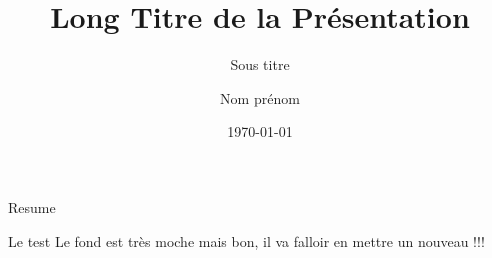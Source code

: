 \documentclass[aspectratio=169,xcolor=dvipsnames, t]{beamer}
\title[short title]{Long Titre de la Présentation}
\subtitle{Sous titre}
\author{Nom prénom}
\institute[ATACC, Association de tutorat]{ATACC, Association de tutorat
\newline
Université de Rouen
}
\date{\today} %
\begin{document}
\maketitlepage

\begin{frame}[t]{Resume}
    \tableofcontents
\end{frame}


\begin{frame}{Le test}
    Le fond est très moche mais bon, il va falloir en mettre un nouveau !!!
\end{frame}

\makefinalpage
\end{document}
